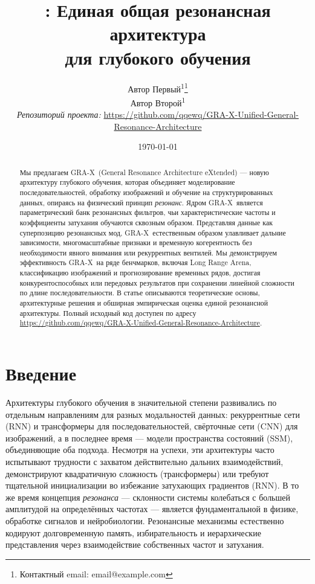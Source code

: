 \documentclass{article}
\title{\GRA: Единая общая резонансная архитектура \\ для глубокого обучения}
\author{
  Автор Первый\textsuperscript{1}\thanks{Контактный email: email@example.com} \\
  Автор Второй\textsuperscript{1} \\
  \textit{Репозиторий проекта:} \url{https://github.com/qqewq/GRA-X-Unified-General-Resonance-Architecture}
}
\date{\today}
\newcommand{\GRA}{\textsc{GRA-X}}
\newcommand{\resonance}{\textit{резонанс}}
\begin{document}
\maketitle

\begin{abstract}
Мы предлагаем \GRA\ (General Resonance Architecture eXtended) — новую архитектуру глубокого обучения, которая объединяет моделирование последовательностей, обработку изображений и обучение на структурированных данных, опираясь на физический принцип \resonance.
Ядром \GRA\ является параметрический банк резонансных фильтров, чьи характеристические частоты и коэффициенты затухания обучаются сквозным образом.
Представляя данные как суперпозицию резонансных мод, \GRA\ естественным образом улавливает дальние зависимости, многомасштабные признаки и временную когерентность без необходимости явного внимания или рекуррентных вентилей.
Мы демонстрируем эффективность \GRA\ на ряде бенчмарков, включая Long Range Arena, классификацию изображений и прогнозирование временных рядов, достигая конкурентоспособных или передовых результатов при сохранении линейной сложности по длине последовательности.
В статье описываются теоретические основы, архитектурные решения и обширная эмпирическая оценка единой резонансной архитектуры.
Полный исходный код доступен по адресу \url{https://github.com/qqewq/GRA-X-Unified-General-Resonance-Architecture}.
\end{abstract}

\section{Введение}
\label{sec:intro}

Архитектуры глубокого обучения в значительной степени развивались по отдельным направлениям для разных модальностей данных: рекуррентные сети (RNN) и трансформеры для последовательностей, свёрточные сети (CNN) для изображений, а в последнее время — модели пространства состояний (SSM), объединяющие оба подхода.
Несмотря на успехи, эти архитектуры часто испытывают трудности с захватом действительно дальних взаимодействий, демонстрируют квадратичную сложность (трансформеры) или требуют тщательной инициализации во избежание затухающих градиентов (RNN).
В то же время концепция \emph{резонанса} — склонности системы колебаться с большей амплитудой на определённых частотах — является фундаментальной в физике, обработке сигналов и нейробиологии.
Резонансные механизмы естественно кодируют долговременную память, избирательность и иерархические представления через взаимодействие собственных частот и затухания.
\end{document}
